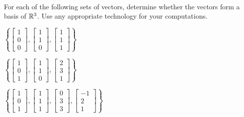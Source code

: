 \begin{pa} \label{pa:3_d} ~
\be

\item For each of the following sets of vectors, determine whether the vectors form a basis of $\mathbb{R}^3$. Use any appropriate technology for your computations. 
	\ba
	\item $\left\{\left[ \begin{array}{c} 1\\0\\0\end{array} \right],\left[ \begin{array}{c} 1\\1\\ 0\end{array} \right], \left[ \begin{array}{c} 1\\1\\1\end{array} \right]\right\}$
	

	\item $\left\{\left[ \begin{array}{c} 1\\0\\1\end{array} \right],\left[ \begin{array}{c} 1\\1\\ 0\end{array} \right], \left[ \begin{array}{c} 2\\3\\1\end{array} \right]\right\}$ 
	

	\item $\left\{\left[ \begin{array}{c} 1\\0\\1\end{array} \right],\left[ \begin{array}{c} 1\\1\\ 1\end{array} \right], \left[ \begin{array}{c} 0\\3\\3\end{array} \right], \left[ \begin{array}{r} -1\\2\\1\end{array} \right]\right\}$
	


\end{pa}
